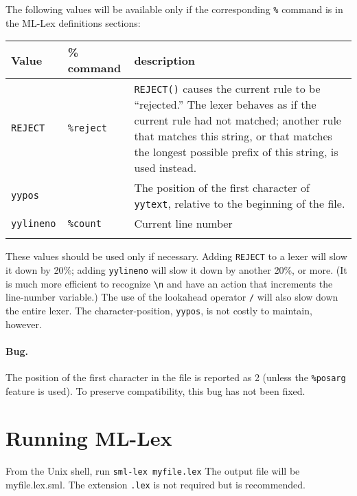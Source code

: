 The following values will be available only if the corresponding \verb|%|
command is in the ML-Lex definitions sections:

\begin{tabular}{lll}
\\
{\bf Value}&{\bf \% command}&{\bf description}\\
\hline
{\tt REJECT} &{\tt\%reject}&\parbox[t]{2.6in}{{\tt REJECT()} causes the current
                                        rule to be ``rejected.''
                                        The lexer behaves as if the
                                        current rule had not matched;
                                        another rule that matches this
                                        string, or that matches the longest
                                        possible prefix of this string,
                                        is used instead.} \\
{\tt yypos} & & \parbox[t]{2.6in}{The position of the first character
of {\tt yytext}, relative to the beginning of the file.}\\
{\tt yylineno } & {\tt \%count} &         Current line number\\
\\
\end{tabular}


These values should be used only if necessary.  Adding {\tt REJECT} to a
lexer will slow it down by 20\%; adding {\tt yylineno} will slow it down by
another 20\%, or more.  (It is much more efficient to
recognize \verb|\n| and
have an action that increments the line-number variable.)  The use of
the lookahead operator {\tt /} will also slow down the entire lexer.
The character-position, {\tt yypos}, is not costly to maintain, however.

\paragraph{Bug.} The position of the first character in the file
is reported as 2 (unless the {\tt \%posarg} feature is used).
To preserve compatibility, this bug has not been fixed.

\section{Running ML-Lex}

From the Unix shell, run    {\tt sml-lex~myfile.lex}
The output file will be myfile.lex.sml.  The extension {\tt .lex} is not
required but is recommended.

